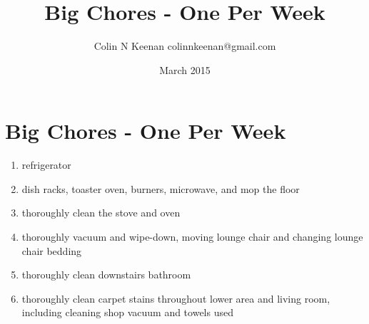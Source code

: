 \documentclass[12pt,letterpaper]{article}
\newcommand{\mytitle}{Big Chores - One Per Week}
\begin{document}
\title{\mytitle{}}
\author{Colin N Keenan colinnkeenan@gmail.com}
\date{March 2015}
\section*{\mytitle{}}
\begin{enumerate}
	\item refrigerator
	\item dish racks, toaster oven, burners, microwave, and mop the floor
	\item thoroughly clean the stove and oven
	\item thoroughly vacuum and wipe-down, moving lounge chair and changing lounge chair bedding
	\item thoroughly clean downstairs bathroom
	\item thoroughly clean carpet stains throughout lower area and living room, including cleaning shop vacuum and towels used
\end{enumerate}
\end{document}
